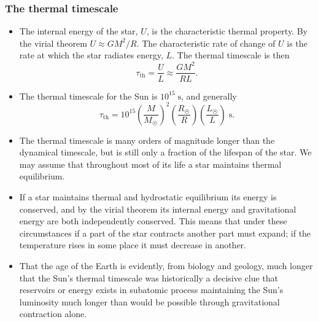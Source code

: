 \documentclass[]{article}
\newcommand{\unit}[1]{\;\mathrm{#1}}
\newcommand{\sub}[1]{_{\text{#1}}}
\newcommand{\rsun}{R_{\astrosun}}
\newcommand{\msun}{M_{\astrosun}}
\newcommand{\lsun}{L_{\astrosun}}
\begin{document}
\subsubsection*{The thermal timescale}
\begin{itemize}
\item The internal energy of the star, $U$, is the characteristic thermal
property. By the virial theorem $U\approx{G}M^2/R$. The characteristic rate of
change of $U$ is the rate at which the star radiates energy, $L$. The thermal
timescale is then
\begin{equation}
\tau\sub{th} = \frac{U}{L} \approx \frac{GM^2}{RL}.
\end{equation}

\item The thermal timescale for the Sun is $10^{15}\unit{s}$, and generally
\begin{equation}
\tau\sub{th} =
10^{15}\left(\frac{M}{\msun}\right)^2\left(\frac{\rsun}{R}\right)
\left(\frac{\lsun}{L}\right)\unit{s}.
\end{equation}

\item The thermal timescale is many orders of magnitude longer than the
dynamical timescale, but is still only a fraction of the lifespan of the star.
We may assume that throughout most of its life a star maintains thermal
equilibrium.

\item If a star maintains thermal and hydrostatic equilibrium its energy is
conserved, and by the virial theorem its internal energy and gravitational
energy are both independently conserved. This means that under these
circumstances if a part of the star contracts another part must expand; if the
temperature rises in some place it must decrease in another.

\item That the age of the Earth is evidently, from biology and geology, much
longer that the Sun's thermal timescale was historically a decisive clue that
reservoirs or energy exists in subatomic process maintaining the Sun's
luminosity much longer than would be possible through gravitational contraction
alone.
\end{itemize}
\end{document}
